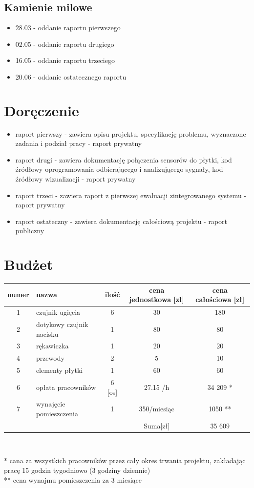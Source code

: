 \documentclass{article}
\begin{document}
\subsection{Kamienie milowe}
\begin{itemize}
\item 28.03 - oddanie raportu pierwszego
\item 02.05 - oddanie raportu drugiego
\item 16.05 - oddanie raportu trzeciego
\item 20.06 - oddanie ostatecznego raportu
\end{itemize}


\section{Doręczenie}
\begin{itemize}
\item raport pierwszy -  zawiera opisu projektu, specyfikację problemu, wyznaczone zadania i podział pracy - raport prywatny
\item raport drugi - zawiera dokumentację połączenia sensorów do płytki, kod źródłowy oprogramowania odbierającego i analizującego sygnały, kod źródłowy wizualizacji - raport prywatny
\item raport trzeci - zawiera raport z pierwszej ewaluacji zintegrowanego systemu - raport prywatny
\item raport ostateczny - zawiera dokumentację całościową projektu - raport publiczny
\end{itemize}


\section{Budżet}
\begin{center}
\begin{tabular}{|c|l|c|c|c|} \hline
    numer & nazwa & ilość & cena jednostkowa [zł] & cena całościowa [zł] \\ \hline
    1 & czujnik ugięcia & 6 & 30 & 180 \\
    2 & dotykowy czujnik nacisku & 1 & 80 & 80 \\
    3 & rękawiczka & 1 & 20 & 20 \\
    4 & przewody & 2 & 5 & 10 \\
    5 & elementy płytki & 1 & 60 & 60\\
    6 & opłata pracowników & 6 [os] & 27.15 /h & 34 209 *\\
    7 & wynajęcie pomieszczenia & 1 & 350/miesiąc & 1050 ** \\\hline
    \hline
    & & & Suma[zł] & 35 609\\
    \hline
\end{tabular}\\
\vspace{3mm}
\end{center}
* cana za wszystkich pracowników przez cały okres trwania projektu, zakładając pracę 15 godzin tygodniowo (3 godziny dziennie)\\
** cena wynajmu pomieszczenia za 3 miesiące
\end{document}
